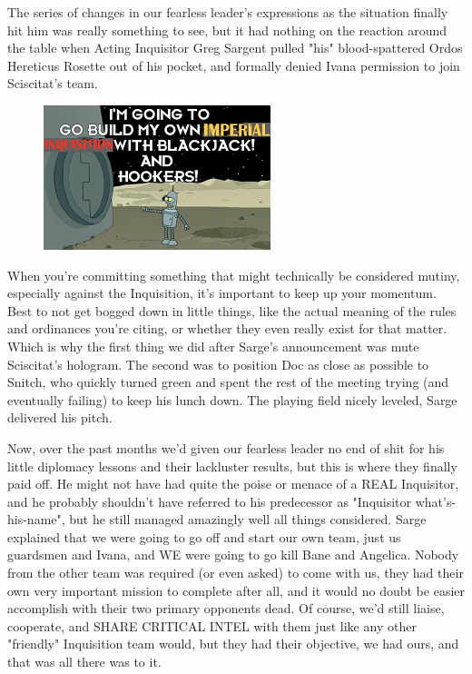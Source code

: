The series of changes in our fearless leader's expressions as the situation finally hit him was really something to see, but it had nothing on the reaction around the table when Acting Inquisitor Greg Sargent pulled "his" blood-spattered Ordos Hereticus Rosette out of his pocket, and formally denied Ivana permission to join Sciscitat's team.

\begin{figure}
	\begin{center}
		\includegraphics[width=\figwidth]{pics/19/16.png}
	\end{center}
\end{figure}
When you're committing something that might technically be considered mutiny, especially against the Inquisition, it's important to keep up your momentum. 
Best to not get bogged down in little things, like the actual meaning of the rules and ordinances you're citing, or whether they even really exist for that matter. 
Which is why the first thing we did after Sarge's announcement was mute Sciscitat's hologram. 
The second was to position Doc as close as possible to Snitch, who quickly turned green and spent the rest of the meeting trying (and eventually failing) to keep his lunch down. 
The playing field nicely leveled, Sarge delivered his pitch.

Now, over the past months we'd given our fearless leader no end of shit for his little diplomacy lessons and their lackluster results, but this is where they finally paid off. 
He might not have had quite the poise or menace of a REAL Inquisitor, and he probably shouldn't have referred to his predecessor as "Inquisitor what's-his-name", but he still managed amazingly well all things considered. 
Sarge explained that we were going to go off and start our own team, just us guardsmen and Ivana, and WE were going to go kill Bane and Angelica. 
Nobody from the other team was required (or even asked) to come with us, they had their own very important mission to complete after all, and it would no doubt be easier accomplish with their two primary opponents dead. 
Of course, we'd still liaise, cooperate, and SHARE CRITICAL INTEL with them just like any other "friendly" Inquisition team would, but they had their objective, we had ours, and that was all there was to it.

